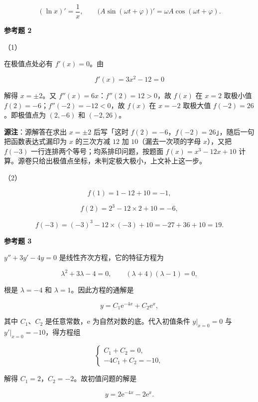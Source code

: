 \begin{answer}
\nopagebreak[4]
\[
(\ln x)'=\frac1x,
\qquad
\bigl(A\sin(\omega t+\varphi)\bigr)'
=\omega A\cos(\omega t+\varphi).
\]

\textbf{参考题 2}

（1）

在极值点处必有 $f'(x)=0$。由

\nopagebreak[4]
\[
f'(x)=3x^2-12=0
\]

解得 $x=\pm2$。又 $f''(x)=6x$：$f''(2)=12>0$，故 $f(x)$ 在 $x=2$ 取极小值 $f(2)=-6$；$f''(-2)=-12<0$，故 $f(x)$ 在 $x=-2$ 取极大值 $f(-2)=26$。即极值点为 $(2,-6)$ 和 $(-2,26)$。

\begin{gktip}
\textbf{源注}：源解答在求出 $x=\pm2$ 后写「这时 $f(2)=-6$，$f(-2)=26$」，随后一句把函数表达式漏印为 $x$ 的三次方减 $12$ 加 $10$（漏去一次项的字母 $x$），又把 $f(-3)$ 一行连排两个等号；均系排印问题，按题面 $f(x)=x^3-12x+10$ 计算。源卷只给出极值点坐标，未判定极大极小，上文补上这一步。
\end{gktip}

（2）

\nopagebreak[4]
\[
f(1)=1-12+10=-1,
\]

\nopagebreak[4]
\[
f(2)=2^3-12\times2+10=-6,
\]

\nopagebreak[4]
\[
f(-3)=(-3)^3-12\times(-3)+10=-27+36+10=19.
\]

\textbf{参考题 3}

$y''+3y'-4y=0$ 是线性齐次方程，它的特征方程为

\nopagebreak[4]
\[
\lambda^2+3\lambda-4=0,
\qquad
(\lambda+4)(\lambda-1)=0,
\]

根是 $\lambda=-4$ 和 $\lambda=1$。因此方程的通解是

\nopagebreak[4]
\[
y=C_1\mathrm e^{-4x}+C_2\mathrm e^{x},
\]

其中 $C_1$、$C_2$ 是任意常数，$\mathrm e$ 为自然对数的底。代入初值条件 $y\big|_{x=0}=0$ 与 $y'\big|_{x=0}=-10$，得方程组

\nopagebreak[4]
\[
\begin{cases}
C_1+C_2=0,\\
-4C_1+C_2=-10,
\end{cases}
\]

解得 $C_1=2$，$C_2=-2$。故初值问题的解是

\nopagebreak[4]
\[
y=2\mathrm e^{-4x}-2\mathrm e^{x}.
\]


\end{answer}